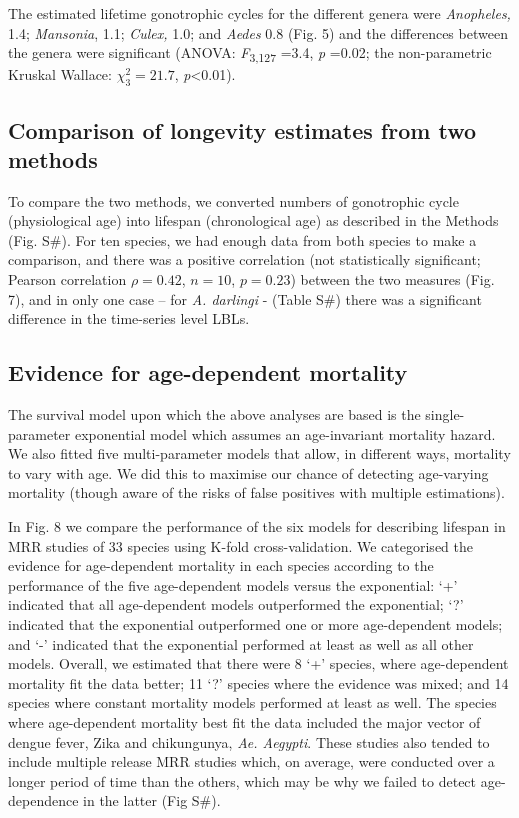\documentclass[]{article}
\begin{document}
The estimated lifetime gonotrophic cycles for the different genera were
\emph{Anopheles,} 1.4; \emph{Mansonia}, 1.1; \emph{Culex,} 1.0; and
\emph{Aedes} 0.8 (Fig. 5) and the differences between the genera were
significant (ANOVA: \emph{F}\textsubscript{3,127} =3.4, \emph{p} =0.02;
the non-parametric Kruskal Wallace: \(\chi_{3}^{2} = 21.7\),
\emph{p}\textless{}0.01).

\subsection{Comparison of longevity estimates from two
methods}\label{comparison-of-longevity-estimates-from-two-methods}

To compare the two methods, we converted numbers of gonotrophic cycle
(physiological age) into lifespan (chronological age) as described in
the Methods (Fig. S\#). For ten species, we had enough data from both
species to make a comparison, and there was a positive correlation (not
statistically significant; Pearson correlation $\rho=0.42$, $n=10$, $p=0.23$)
between the two measures (Fig. 7), and in only one case -- for \emph{A.
darlingi} - (Table S\#) there was a significant difference in the
time-series level LBLs.

\subsection{Evidence for age-dependent
mortality}\label{evidence-for-age-dependent-mortality}

The survival model upon which the above analyses are based is the
single-parameter exponential model which assumes an age-invariant
mortality hazard. We also fitted five multi-parameter models that allow,
in different ways, mortality to vary with age. We did this to maximise
our chance of detecting age-varying mortality (though aware of the risks
of false positives with multiple estimations).

In Fig. 8 we compare the performance of the six models for describing
lifespan in MRR studies of 33 species using K-fold cross-validation. We
categorised the evidence for age-dependent mortality in each species
according to the performance of the five age-dependent models versus the
exponential: `+' indicated that all age-dependent models outperformed
the exponential; `?' indicated that the exponential outperformed one or
more age-dependent models; and `-' indicated that the exponential
performed at least as well as all other models. Overall, we estimated
that there were 8 `+' species, where age-dependent mortality fit the
data better; 11 `?' species where the evidence was mixed; and 14 species
where constant mortality models performed at least as well. The species
where age-dependent mortality best fit the data included the major
vector of dengue fever, Zika and chikungunya, \emph{Ae. Aegypti}. These
studies also tended to include multiple release MRR studies which, on
average, were conducted over a longer period of time than the others,
which may be why we failed to detect age-dependence in the latter (Fig
S\#).
\end{document}
